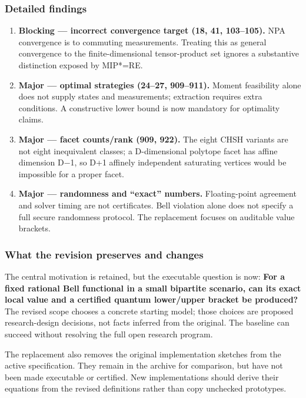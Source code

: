 \documentclass[
  11pt,
]{article}
\begin{document}
\subsubsection{Detailed findings}

\begin{enumerate}
\def\labelenumi{\arabic{enumi}.}
\item
  \textbf{Blocking --- incorrect convergence target (18, 41, 103--105).}
  NPA convergence is to commuting measurements. Treating this as general
  convergence to the finite-dimensional tensor-product set ignores a
  substantive distinction exposed by MIP*=RE.
\item
  \textbf{Major --- optimal strategies (24--27, 909--911).} Moment
  feasibility alone does not supply states and measurements; extraction
  requires extra conditions. A constructive lower bound is now mandatory
  for optimality claims.
\item
  \textbf{Major --- facet counts/rank (909, 922).} The eight CHSH
  variants are not eight inequivalent classes; a D-dimensional polytope
  facet has affine dimension D\ensuremath{-}1, so D+1 affinely
  independent saturating vertices would be impossible for a proper
  facet.
\item
  \textbf{Major --- randomness and ``exact'' numbers.} Floating-point
  agreement and solver timing are not certificates. Bell violation alone
  does not specify a full secure randomness protocol. The replacement
  focuses on auditable value brackets.
\end{enumerate}

\subsubsection{What the revision preserves and changes}

The central motivation is retained, but the executable question is now:
\textbf{For a fixed rational Bell functional in a small bipartite
scenario, can its exact local value and a certified quantum lower/upper
bracket be produced?} The revised scope chooses a concrete starting
model; those choices are proposed research-design decisions, not facts
inferred from the original. The baseline can succeed without resolving
the full open research program.

The replacement also removes the original implementation sketches from
the active specification. They remain in the archive for comparison, but
have not been made executable or certified. New implementations should
derive their equations from the revised definitions rather than copy
unchecked prototypes.
\end{document}

